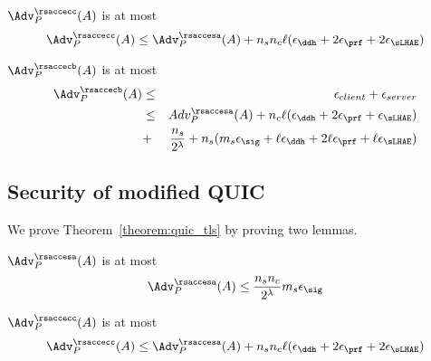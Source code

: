 \begin{lemma} \label{lemma:quic_rsacce-cc}
 $\Adv^{\rsaccecc}_{P}(A)$ is at most
 \begin{equation}
  \Adv^{\rsaccecc}_{P}(A) \leq \Adv^{\rsaccesa}_{P}(A) + n_sn_c\ell(\epsilon_{\ddh} + 2\epsilon_{\prf} + 2\epsilon_{\sLHAE})
 \end{equation}
\end{lemma}
%


\begin{lemma} \label{lemma:quic_cetv_rsacce-cb}
 $\Adv^{\rsaccecb}_{P}(A)$ is at most
 \begin{eqnarray}
  \Adv^{\rsaccecb}_{P}(A) &\leq& \epsilon_{client} + \epsilon_{server} \nonumber \\
  &\leq& Adv^{\rsaccesa}_{P}(A) + n_c\ell(\epsilon_{\ddh} + 2\epsilon_{\prf} + \epsilon_{\sLHAE}) \nonumber \\
   &+& \frac{n_s}{2^{\lambda}} + n_s(m_s\epsilon_{\sig} + \ell\epsilon_{\ddh} + 2\ell\epsilon_{\prf} + \ell\epsilon_{\sLHAE})
 \end{eqnarray}
\end{lemma}
%


\subsection{Security of modified QUIC} \label{app:quic_tls}

We prove Theorem~\ref{theorem:quic_tls} by proving two lemmas.

\begin{lemma} \label{lemma:quic_tls_rsacce-sa}
 $\Adv^{\rsaccesa}_{P}(A)$ is at most
 \begin{equation}
  \Adv^{\rsaccesa}_{P}(A) \leq \frac{n_s n_c}{2^{\lambda}} m_s \epsilon_{\sig}
 \end{equation}
\end{lemma}
%


\begin{lemma} \label{lemma:quic_rsacce-cc}
 $\Adv^{\rsaccecc}_{P}(A)$ is at most
 \begin{equation}
  \Adv^{\rsaccecc}_{P}(A) \leq \Adv^{\rsaccesa}_{P}(A) + n_sn_c\ell(\epsilon_{\ddh} + 2\epsilon_{\prf} + 2\epsilon_{\sLHAE})
 \end{equation}
\end{lemma}
%



